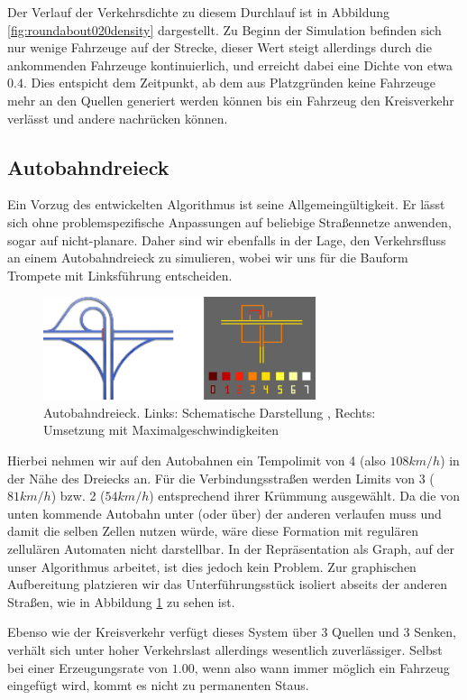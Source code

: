 \documentclass[10pt, a4paper]{article}
\newcommand\q[1]{\glqq{}#1\grqq{}}
\begin{document}
Der Verlauf der Verkehrsdichte zu diesem Durchlauf ist in Abbildung \ref{fig:roundabout020density} dargestellt. Zu Beginn der Simulation befinden sich nur wenige Fahrzeuge auf der Strecke, dieser Wert steigt allerdings durch die ankommenden Fahrzeuge kontinuierlich, und erreicht dabei eine Dichte von etwa $0.4$. Dies entspicht dem Zeitpunkt, ab dem aus Platzgründen keine Fahrzeuge mehr an den Quellen generiert werden können bis ein Fahrzeug den Kreisverkehr verlässt und andere nachrücken können.

\subsection{Autobahndreieck}
Ein Vorzug des entwickelten Algorithmus ist seine Allgemeingültigkeit. Er lässt sich ohne problemspezifische Anpassungen auf beliebige Straßennetze anwenden, sogar auf nicht-planare. Daher sind wir ebenfalls in der Lage, den Verkehrsfluss an einem Autobahndreieck zu simulieren, wobei wir uns für die Bauform \q{Trompete} mit Linksführung entscheiden.

\begin{figure}[h!]
	\centering
	\includegraphics[width=8cm]{img/interchangeTrumpetSpeedLimits}
	\caption{Autobahndreieck. Links: Schematische Darstellung \cite{wiki:trumpetInterchange}, Rechts: Umsetzung mit Maximalgeschwindigkeiten}
	\label{fig:interchangeTrumpet}
\end{figure}

Hierbei nehmen wir auf den Autobahnen ein Tempolimit von 4 (also $108km/h$) in der Nähe des Dreiecks an. Für die Verbindungsstraßen werden Limits von 3 ($81km/h$) bzw. 2 ($54km/h$) entsprechend ihrer Krümmung ausgewählt. Da die von unten kommende Autobahn unter (oder über) der anderen verlaufen muss und damit die selben Zellen nutzen würde, wäre diese Formation mit regulären zellulären Automaten nicht darstellbar. In der Repräsentation als Graph, auf der unser Algorithmus arbeitet, ist dies jedoch kein Problem. Zur graphischen Aufbereitung platzieren wir das Unterführungsstück isoliert abseits der anderen Straßen, wie in Abbildung \ref{fig:interchangeTrumpet} zu sehen ist.

Ebenso wie der Kreisverkehr verfügt dieses System über 3 Quellen und 3 Senken, verhält sich unter hoher Verkehrslast allerdings wesentlich zuverlässiger. Selbst bei einer Erzeugungsrate von $1.00$, wenn also wann immer möglich ein Fahrzeug eingefügt wird, kommt es nicht zu permanenten Staus.
\end{document}
